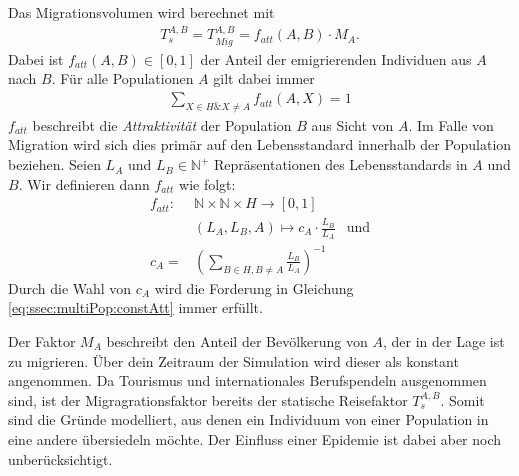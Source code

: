 Das Migrationsvolumen wird berechnet mit
\begin{align}
	T^{A,B}_s=T^{A,B}_{Mig} = f_{att}(A,B)\cdot M_A.
\end{align}
Dabei ist $f_{att}(A,B) \in [0,1]$ der Anteil der emigrierenden Individuen aus $A$ nach $B$. Für alle Populationen $A$ gilt dabei immer
\begin{align}
	\sum\limits_{X \in H \& X\neq A} f_{att}(A,X) = 1\label{eq:ssec:multiPop:constAtt}
\end{align}
$f_{att}$ beschreibt die \emph{Attraktivität} der Population $B$ aus Sicht von $A$. Im Falle von Migration wird sich dies primär auf den Lebensstandard innerhalb der Population beziehen. Seien $L_A$ und $L_B\in \mathbb{N^+}$ Repräsentationen des Lebensstandards in $A$ und $B$. Wir definieren dann $f_{att}$ wie folgt:
\begin{align}
		f_{att} :& \mathbb{N}\times \mathbb{N}\times H \rightarrow  [0,1]\\
			 & (L_A,L_B,A)\longmapsto		c_A\cdot\frac{L_B}{L_A}& \text{und}\nonumber\\
		c_A = & \left( \sum\limits_{B\in H, B\neq A} \frac{L_B}{L_A}\right)^{-1}&
\end{align}
Durch die Wahl von $c_A$ wird die Forderung in Gleichung \ref{eq:ssec:multiPop:constAtt} immer erfüllt.

Der Faktor $M_A$ beschreibt den Anteil der Bevölkerung von $A$, der in der Lage ist zu migrieren. Über dein Zeitraum der Simulation wird dieser als konstant angenommen. Da Tourismus und internationales Berufspendeln ausgenommen sind, ist der Migragrationsfaktor bereits der statische Reisefaktor $T^{A,B}_s$. Somit sind die Gründe modelliert, aus denen ein Individuum von einer Population in eine andere übersiedeln möchte. Der Einfluss einer Epidemie ist dabei aber noch unberücksichtigt. 

